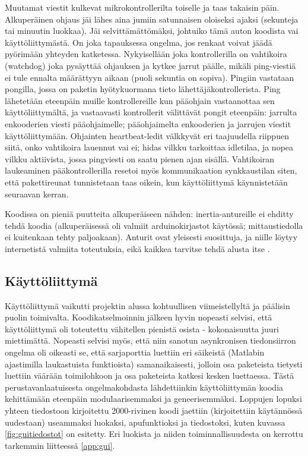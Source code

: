 \documentclass{article}
\begin{document}
Muutamat viestit kulkevat mikrokontrollerilta toiselle ja taas takaisin päin. Alkuperäinen ohjaus jäi lähes aina jumiin satunnaisen oloiseksi ajaksi (sekunteja tai minuutin luokkaa). Jäi selvittämättömäksi, johtuiko tämä auton koodista vai käyttöliittymästä. On joka tapauksessa ongelma, jos renkaat voivat jäädä pyörimään yhteyden katketessa. Nykyisellään joka kontrollerilla on vahtikoira (watchdog) joka pysäyttää ohjauksen ja kytkee jarrut päälle, mikäli ping-viestiä ei tule ennalta määrättyyn aikaan (puoli sekuntia on sopiva). Pingiin vastataan pongilla, jossa on paketin hyötykuormana tieto lähettäjäkontrollerista. Ping lähetetään eteenpäin muille kontrollereille kun pääohjain vastaanottaa sen käyttöliittymältä, ja vastaavasti kontrollerit välittävät pongit eteenpäin: jarrulta enkooderien viesti pääohjaimelle; pääohjaimelta enkooderien ja jarrujen viestit käyttöliittymään. Ohjainten heartbeat-ledit välkkyvät eri taajuudella riippuen siitä, onko vahtikoira lauennut vai ei; hidas vilkku tarkoittaa idletilaa, ja nopea vilkku aktiivista, jossa pingviesti on saatu pienen ajan sisällä. Vahtikoiran laukeaminen pääkontrollerilla resetoi myös kommunikaation synkkaustilan siten, että pakettireunat tunnistetaan taas oikein, kun käyttöliittymä käynnistetään seuraavan kerran.

Koodissa on pieniä puutteita alkuperäiseen nähden: inertia-antureille ei ehditty tehdä koodia (alkuperäisessä oli valmiit arduinokirjastot käytössä; mittaustiedolla ei kuitenkaan tehty paljoakaan). Anturit ovat yleisesti suosittuja, ja niille löytyy internetistä valmiita toteutuksia, eikä kaikkea tarvitse tehdä alusta itse \cite{bib:sparkfunacc} \cite{bib:sparkfungyro}.

\subsection{Käyttöliittymä}
Käyttöliittymä vaikutti projektin alussa kohtuullisen viimeistellyltä ja päälisin puolin toimivalta. Koodikatselmoinnin jälkeen hyvin nopeasti selvisi, että käyttöliittymä oli toteutettu vähitellen pienistä osista - kokonaisuutta juuri miettimättä. Nopeasti selvisi myös, että niin sanotun asynkronisen tiedonsiirron ongelma oli oikeasti se, että sarjaporttia luettiin eri säikeistä (Matlabin ajastimilla laukastuista funktioista) samanaikaisesti, jolloin osa paketeista tietysti luettiin väärään toimilohkoon ja osa paketeista katkesi kesken luettaessa. Tästä perustavanlaatuisesta ongelmakohdasta lähdettiinkin käyttöliittymän koodia kehittämään eteenpäin modulaarisemmaksi ja geneerisemmäksi. Loppujen lopuksi yhteen tiedostoon kirjoitettu 2000-rivinen koodi jaettiin (kirjoitettiin käytännössä uudestaan) useammaksi luokaksi, apufunktioksi ja tiedostoksi, kuten kuvassa \ref{fig:guitiedostot} on esitetty. Eri luokista ja niiden toiminnallisuudesta on kerrottu tarkemmin liitteessä \ref{app:gui}.
\end{document}

